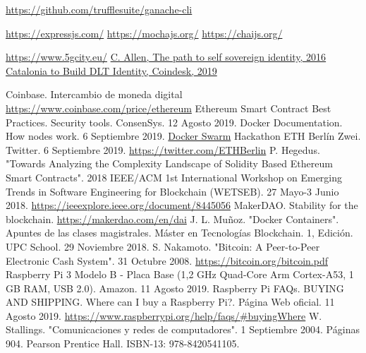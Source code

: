 \documentclass[12pt]{amsart}
\begin{document}
\begin{multicols}{2}
\begin{thebibliography}{9}
  \href{https://github.com/trufflesuite/ganache-cli}{https://github.com/trufflesuite/ganache-cli}

  \href{https://expressjs.com/}{https://expressjs.com/}
  \href{https://mochajs.org/}{https://mochajs.org/}
  \href{https://chaijs.org/}{https://chaijs.org/}

 \href{https://www.5gcity.eu/}{https://www.5gcity.eu/}
  \href{http://www.lifewithalacrity.com/2016/04/the-path-to-self-soverereign-identity.html}
  {C. Allen, The path to self sovereign identity, 2016}
  \href{https://www.coindesk.com/catalonia-government-to-build-dlt-based-identity-platform-for-citizens}
       {Catalonia to Build DLT Identity, Coindesk, 2019}


 Coinbase. Intercambio de moneda digital \href{https://www.coinbase.com/price/ethereum}{https://www.coinbase.com/price/ethereum}
 Ethereum Smart Contract Best Practices. Security tools. ConsenSys. 12 Agosto 2019.
 Docker Documentation. How nodes work. 6 Septiembre 2019.  \href{https://docs.docker.com/engine/swarm/how-swarm-mode-works/nodes/}{Docker Swarm}
 Hackathon ETH Berlín Zwei. Twitter. 6 Septiembre 2019. \href{https://twitter.com/ETHBerlin}{https://twitter.com/ETHBerlin}
 P. Hegedus. "Towards Analyzing the Complexity Landscape of Solidity Based Ethereum Smart Contracts". 2018 IEEE/ACM 1st International Workshop on Emerging Trends in Software Engineering for Blockchain (WETSEB). 27 Mayo-3 Junio 2018. \href{https://ieeexplore.ieee.org/document/8445056}{https://ieeexplore.ieee.org/document/8445056}
 MakerDAO. Stability for the blockchain.  \href{https://makerdao.com/en/dai}{https://makerdao.com/en/dai}
 J. L. Muñoz. "Docker Containers". Apuntes de las clases magistrales. Máster en Tecnologías Blockchain. 1, Edición. UPC School. 29 Noviembre 2018.
 S. Nakamoto. "Bitcoin: A Peer-to-Peer Electronic Cash System". 31 Octubre 2008.  \href{https://bitcoin.org/bitcoin.pdf}{https://bitcoin.org/bitcoin.pdf}
 Raspberry Pi 3 Modelo B - Placa Base (1,2 GHz Quad-Core Arm Cortex-A53, 1 GB RAM, USB 2.0). Amazon. 11 Agosto 2019.
 Raspberry Pi FAQs. BUYING AND SHIPPING. Where can I buy a Raspberry Pi?. Página Web oficial. 11 Agosto 2019.  \href{https://www.raspberrypi.org/help/faqs/#buyingWhere}{https://www.raspberrypi.org/help/faqs/\#buyingWhere}
 W. Stallings. "Comunicaciones y redes de computadores". 1 Septiembre 2004. Páginas 904. Pearson Prentice Hall. ISBN-13: 978-8420541105.




\end{thebibliography}
\end{multicols}
\end{document}
